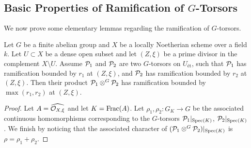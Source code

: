 \subsection*{Basic Properties of Ramification of \texorpdfstring{$G$-Torsors}{G-Torsors}}
We now prove some elementary lemmas regarding the ramification of $G$-torsors.
\begin{lemma}\label{lemma:bounding_ramification_of_contracted_product}
    Let $G$ be a finite abelian group and $X$ be a locally Noetherian scheme over a field $k$.
    Let $U \subset X$ be a dense open subset and let $(Z, \xi)$ be a prime divisor in the complement $X \setminus U$.
    Assume $\mathcal{P}_1$ and $\mathcal{P}_2$ are two $G$-torsors on $U_{\text{ét}}$, such that $\mathcal{P}_1$ has ramification bounded by $r_1$ at $(Z, \xi)$, and $\mathcal{P}_2$ has ramification bounded by $r_2$ at $(Z, \xi)$.
    Then their product $\mathcal{P}_1 \otimes^G \mathcal{P}_2$ has ramification bounded by $\max(r_1, r_2)$ at $(Z, \xi)$.
\end{lemma}
\begin{proof}
    Let $A=\widehat{\mathcal{O}_{X, \xi}}$ and let $K=\operatorname{Frac}(A)$.
    Let $\rho_1, \rho_2: G_K \to G$ be the associated continuous homomorphisms corresponding to the $G$-torsors
    $\mathcal{P}_1|_{\operatorname{Spec}(K)}$, $\mathcal{P}_2|_{\operatorname{Spec}(K)}$.
    We finish by noticing that the associated character of $(\mathcal{P}_1 \otimes^G \mathcal{P}_2)|_{\operatorname{Spec}(K)}$ is $\rho=\rho_1 + \rho_2$.
\end{proof}

